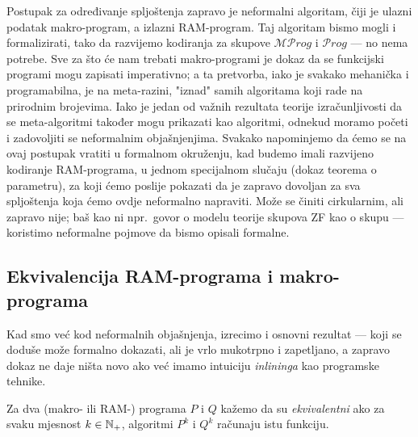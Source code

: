 Postupak za određivanje spljoštenja zapravo je neformalni algoritam, čiji je ulazni podatak makro-program, a izlazni RAM-program. Taj algoritam bismo mogli i formalizirati, tako da razvijemo kodiranja za skupove $\mathcal{MP}rog$ i $\mathcal Prog$ --- no nema potrebe. Sve za što će nam trebati makro-programi je dokaz da se funkcijski programi mogu zapisati imperativno; a ta pretvorba, iako je svakako mehanička i programabilna, je na meta-razini, "iznad" samih algoritama koji rade na prirodnim brojevima. Iako je jedan od važnih rezultata teorije izračunljivosti da se meta-algoritmi također mogu prikazati kao algoritmi, odnekud moramo početi i zadovoljiti se neformalnim objašnjenjima. Svakako napominjemo da ćemo se na ovaj postupak vratiti u formalnom okruženju, kad budemo imali razvijeno kodiranje RAM-programa, u jednom specijalnom slučaju (dokaz teorema o parametru), za koji ćemo poslije pokazati da je zapravo dovoljan za sva spljoštenja koja ćemo ovdje neformalno napraviti. Može se činiti cirkularnim, ali zapravo nije; baš kao ni npr.\ govor o modelu teorije skupova ZF kao o skupu --- koristimo neformalne pojmove da bismo opisali formalne.

\subsection{Ekvivalencija RAM-programa i makro-programa}

Kad smo već kod neformalnih objašnjenja, izrecimo i osnovni rezultat --- koji se doduše može formalno dokazati, ali je vrlo mukotrpno i zapetljano, a zapravo dokaz ne daje ništa novo ako već imamo intuiciju \emph{inlininga} kao programske tehnike.

\begin{definicija}[{name=[ekvivalentnost programa]}]\label{def:ekvprog}
Za dva (makro- ili RAM-\!) programa $P$ i $Q$ kažemo da su \emph{ekvivalentni} ako za svaku mjesnost $k\in{\mathbb N}_+$, algoritmi $P^k$ i $Q^k$ računaju istu funkciju.
\end{definicija}

